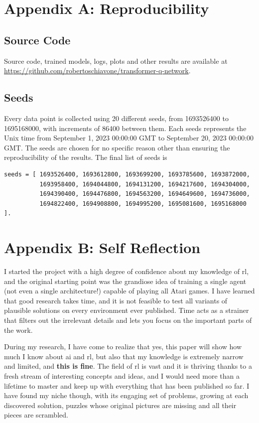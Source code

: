 \section*{Appendix A: Reproducibility} \label{section:appendix_a}

\subsection*{Source Code}
Source code, trained models, logs, plots and other results are available at \url{https://github.com/robertoschiavone/transformer-q-network}.

\subsection*{Seeds}
Every data point is collected using 20 different seeds, from 1693526400 to 1695168000, with increments of 86400 between them. Each seeds represents the Unix time from September 1, 2023 00:00:00 GMT to September 20, 2023 00:00:00 GMT. The seeds are chosen for no specific reason other than ensuring the reproducibility of the results. The final list of seeds is

\begin{verbatim}
seeds = [ 1693526400, 1693612800, 1693699200, 1693785600, 1693872000,
          1693958400, 1694044800, 1694131200, 1694217600, 1694304000,
          1694390400, 1694476800, 1694563200, 1694649600, 1694736000,
          1694822400, 1694908800, 1694995200, 1695081600, 1695168000 ].
\end{verbatim}

\section*{Appendix B:  Self Reflection} \label{section:appendix_b}

I started the project with a high degree of confidence about my knowledge of \acrlong{rl}, and the original starting point was the grandiose idea of training a single agent (not even a single architecture!) capable of playing all Atari games.
I have learned that good research takes time, and it is not feasible to test all variants of plausible solutions on every environment ever published. Time acts as a strainer that filters out the irrelevant details and lets you focus on the important parts of the work.

During my research, I have come to realize that yes, this paper will show how much I know about \acrshort{ai} and \acrshort{rl}, but also that my knowledge is extremely narrow and limited, and \textbf{this is fine}. The field of \acrshort{rl} is vast and it is thriving thanks to a fresh stream of interesting concepts and ideas, and I would need more than a lifetime to master and keep up with everything that has been published so far. I have found my niche though, with its engaging set of problems, growing at each discovered solution, puzzles whose original pictures are missing and all their pieces are scrambled.


